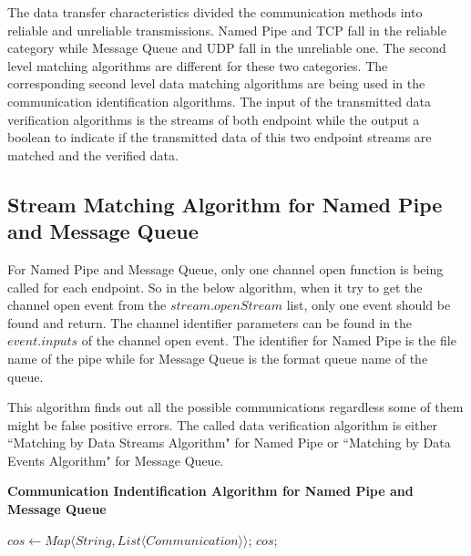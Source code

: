 The data transfer characteristics divided the communication methods into reliable and unreliable transmissions. Named Pipe and TCP fall in the reliable category while Message Queue and UDP fall in the unreliable one. The second level matching algorithms are different for these two categories. The corresponding second level data matching algorithms are being used in the communication identification algorithms. The input of the transmitted data verification algorithms is the streams of both endpoint while the output a boolean to indicate if the transmitted data of this two endpoint streams are matched and the verified data.

\subsection{Stream Matching Algorithm for Named Pipe and Message Queue}
For Named Pipe and Message Queue, only one channel open function is being called for each endpoint. So in the below algorithm, when it try to get the channel open event from the $stream.openStream$ list, only one event should be found and return. The channel identifier parameters can be found in the $event.inputs$ of the channel open event. The identifier for Named Pipe is the file name of the pipe while for Message Queue is the format queue name of the queue. 

This algorithm finds out all the possible communications regardless some of them might be false positive errors. The called data verification algorithm is either ``Matching by Data Streams Algorithm" for Named Pipe or ``Matching by Data Events Algorithm" for Message Queue.

\begin{algorithm}[H]
\DontPrintSemicolon
\caption{{\bf Communication Indentification Algorithm for Named Pipe and Message Queue} \label{channelAlg1}}
$cos \leftarrow Map \langle String, List \langle Communication \rangle \rangle$;\; 
\KwRet $cos$;\;
\end{algorithm} 


